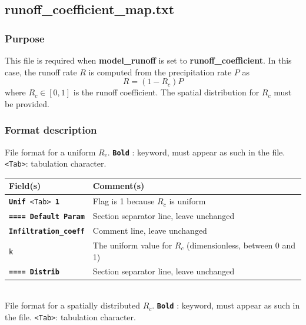 \subsection{runoff\_coefficient\_map.txt}
\subsubsection{Purpose}
This file is required when \textbf{model\_runoff} is set to \textbf{runoff\_coefficient}. In this case, the runoff rate $R$ is computed from the precipitation rate $P$ as
\begin{equation}
R = (1 - R_c) P
\end{equation} where $R_c \in [0, 1]$ is the runoff coefficient. The spatial distribution for $R_c$ must be provided.
%
\subsubsection{Format description}
File format for a uniform $R_c$.  
\texttt{\textbf{Bold}} : keyword, must appear as such in the file. \texttt{<Tab>}: tabulation character. \\
    \begin{tabular}{p{6cm} | p{9cm}}
    \hline
    Field(s) & Comment(s) \\
    \hline  \hline
    \texttt{\textbf{Unif} <Tab> \textbf{1}} & Flag is 1 because $R_c$ is uniform \\ 
    \hline
    \texttt{\textbf{==== Default Param}} & Section separator line, leave unchanged \\
    \hline
    \texttt{\textbf{Infiltration\_coeff}} & Comment line, leave unchanged \\  
    \hline
    \texttt{k} & The uniform value for $R_c$ (dimensionless, between 0 and 1) \\ 
    \hline
    \texttt{\textbf{==== Distrib}} & Section separator line, leave unchanged \\  
    \hline
    \end{tabular}
%
\vspace{10mm} \\
%
File format for a spatially distributed $R_c$.  
\texttt{\textbf{Bold}} : keyword, must appear as such in the file. \texttt{<Tab>}: tabulation character. \\
